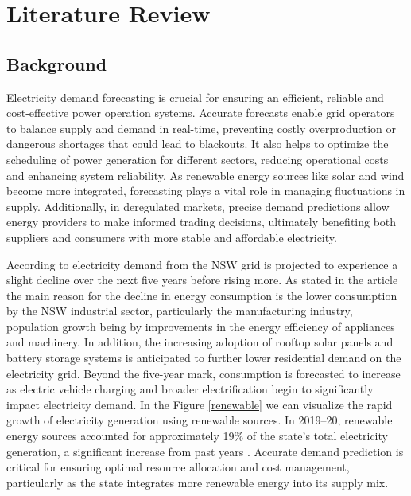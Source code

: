 \documentclass[mstat,12pt]{unswthesis}
\begin{document}
\chapter{Literature Review}\label{literature-review}

\section{Background}\label{background}

Electricity demand forecasting is crucial for ensuring an efficient,
reliable and cost-effective power operation systems. Accurate forecasts
enable grid operators to balance supply and demand in real-time,
preventing costly overproduction or dangerous shortages that could lead
to blackouts. It also helps to optimize the scheduling of power
generation for different sectors, reducing operational costs and
enhancing system reliability. As renewable energy sources like solar and
wind become more integrated, forecasting plays a vital role in managing
fluctuations in supply. Additionally, in deregulated markets, precise
demand predictions allow energy providers to make informed trading
decisions, ultimately benefiting both suppliers and consumers with more
stable and affordable electricity.

According to \cite{nsw_epa_2021_energy_consumption} electricity demand
from the NSW grid is projected to experience a slight decline over the
next five years before rising more. As stated in the article the main
reason for the decline in energy consumption is the lower consumption by
the NSW industrial sector, particularly the manufacturing industry,
population growth being by improvements in the energy efficiency of
appliances and machinery. In addition, the increasing adoption of
rooftop solar panels and battery storage systems is anticipated to
further lower residential demand on the electricity grid. Beyond the
five-year mark, consumption is forecasted to increase as electric
vehicle charging and broader electrification begin to significantly
impact electricity demand. In the Figure \ref{renewable} we can
visualize the rapid growth of electricity generation using renewable
sources. In 2019--20, renewable energy sources accounted for
approximately 19\% of the state's total electricity generation, a
significant increase from past years
\cite{nsw_epa_2021_energy_consumption}. Accurate demand prediction is
critical for ensuring optimal resource allocation and cost management,
particularly as the state integrates more renewable energy into its
supply mix.
\end{document}
